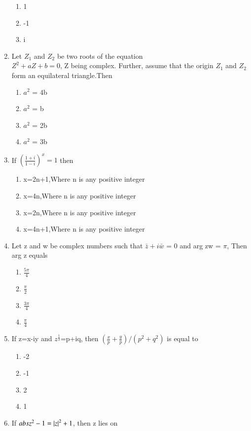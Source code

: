 \begin{enumerate}[label=\arabic*.,ref=\thesubsection.\theenumi]
\begin{enumerate}
    \item  1    
    \item  -1
    \item  i
    \end{enumerate}
    \item Let $Z_1$ and $Z_2$ be two roots of the equation \\
    $Z^2+aZ+b = 0$, Z being complex. Further, assume that the origin $Z_1$ and $Z_2$ form an equilateral triangle.Then
    \begin{enumerate}
    \item  $a^2$ = 4b
    \item  $a^2$ = b    
    \item  $a^2$ = 2b
    \item  $a^2$ = 3b
    \end{enumerate}
    \item If $({\frac{1+i}{1-i}})^x = 1$ then 
    \begin{enumerate}
    \item  x=2n+1,Where n is any positive integer
    \item  x=4n,Where n is any positive integer    
    \item  x=2n,Where n is any positive integer
    \item x=4n+1,Where n is any positive integer
    \end{enumerate}
    \item Let z and w be complex numbers such that $\bar{z}+i\bar{{w}}$ = 0 and arg zw = $\pi$, Then arg z equals
    \begin{enumerate}
    \item  $\frac{5\pi}{4}$
    \item  $\frac{\pi}{2}$    
    \item  $\frac{3\pi}{4}$    
    \item  $\frac{\pi}{4}$
    \end{enumerate}
    \item If z=x-iy and $z^\frac{1}{3}$=p+iq, then $( \frac {x}{p}+\frac{y}{p})/(p^2+q^2)$ is equal to
    \begin{enumerate}
    \item  -2
    \item  -1    
    \item  2
    \item  1
    \end{enumerate}
    \item If $abs z^2-1=\left\vert z\right\vert ^2+1$, then z lies on
    \begin{enumerate}

\end{enumerate}
\end{enumerate}
